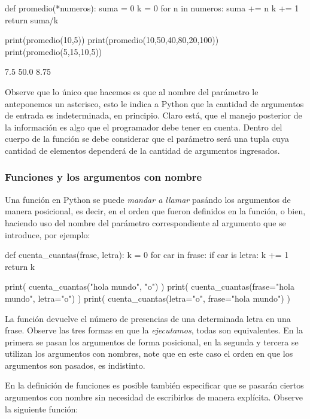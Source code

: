 \begin{python}
def promedio(*numeros):
    suma = 0
    k = 0
    for n in numeros:
        suma += n
        k += 1
    return suma/k

print(promedio(10,5))
print(promedio(10,50,40,80,20,100))
print(promedio(5,15,10,5))
\end{python}
\begin{outscript}
7.5
50.0
8.75
\end{outscript}

Observe que lo único que hacemos es que al nombre del parámetro le anteponemos un asterisco, esto le indica 
a Python que la cantidad de argumentos de entrada es indeterminada, en principio. Claro está, que el manejo posterior 
de la información es algo que el programador debe tener en cuenta. Dentro del cuerpo de la función 
se debe considerar que el parámetro  será una tupla cuya cantidad de elementos dependerá 
de la cantidad de argumentos ingresados.


\subsubsection{Funciones y los argumentos con nombre}

Una función en Python se puede \textit{mandar a llamar} pasándo los argumentos de manera posicional, es 
decir, en el orden que fueron definidos en la función, o bien, haciendo uso del nombre del parámetro correspondiente 
al argumento que se introduce, por ejemplo:

\begin{python}
def cuenta_cuantas(frase, letra):
    k = 0
    for car in frase:
        if car is letra:
            k += 1
    return k

print( cuenta_cuantas("hola mundo", "o") )
print( cuenta_cuantas(frase="hola mundo", letra="o") )
print( cuenta_cuantas(letra="o", frase="hola mundo") )
\end{python}

La función  devuelve el número de presencias de una determinada letra en una frase. Observe 
las tres formas en que la \textit{ejecutamos}, todas son equivalentes. En la primera se pasan los argumentos de 
forma posicional, en la segunda y tercera se utilizan los argumentos con nombres, note que en este caso el orden 
en que los argumentos son pasados, es indistinto.

En la definición de funciones es posible también especificar que se pasarán ciertos argumentos con nombre 
sin necesidad de escribirlos de manera explícita. Observe la siguiente función:

